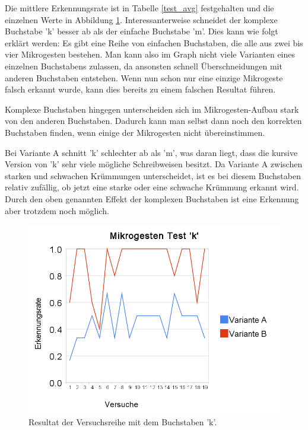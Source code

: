 Die mittlere Erkennungsrate ist in Tabelle \ref{test_avg} festgehalten und die einzelnen Werte in Abbildung \ref{test_k}. Interessanterweise schneidet der komplexe Buchstabe 'k' besser ab als der einfache Buchstabe 'm'. Dies kann wie folgt erklärt werden: Es gibt eine Reihe von einfachen Buchstaben, die alle aus zwei bis vier Mikrogesten bestehen. Man kann also im Graph nicht viele Varianten eines einzelnen Buchstabens zulassen, da ansonsten schnell Überschneidungen mit anderen Buchstaben entstehen. Wenn nun schon nur eine einzige Mikrogeste falsch erkannt wurde, kann dies bereits zu einem falschen Resultat führen.

Komplexe Buchstaben hingegen unterscheiden sich im Mikrogesten-Aufbau stark von den anderen Buchstaben. Dadurch kann man selbst dann noch den korrekten Buchstaben finden, wenn einige der Mikrogesten nicht übereinstimmen.

Bei Variante A schnitt 'k' schlechter ab als 'm', was daran liegt, dass die kursive Version von 'k' sehr viele mögliche Schreibweisen besitzt. Da Variante A zwischen starken und schwachen Krümmungen unterscheidet, ist es bei diesem Buchstaben relativ  zufällig, ob jetzt eine starke oder eine schwache Krümmung erkannt wird. Durch den oben genannten Effekt der komplexen Buchstaben ist eine Erkennung aber trotzdem noch möglich.

\begin{figure}[h!]
  \centering
    \includegraphics[scale=0.4]{./img/mikrogesten_test_k.png}
  \caption{Resultat der Versuchsreihe mit dem Buchstaben 'k'.  }
  \label{test_k}
\end{figure}

